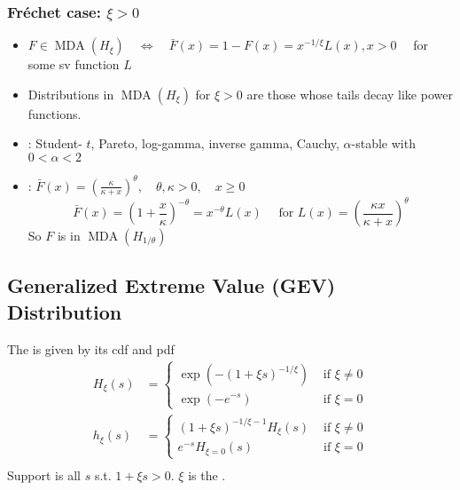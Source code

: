 \subsubsection*{Fréchet case: $\xi>0$}
\begin{itemize}[leftmargin=*]
    \item $F \in \operatorname{MDA}\left(H_{\xi}\right) \quad \Leftrightarrow \quad \bar{F}(x)=1-F(x)=x^{-1 / \xi} L(x), x>0 \quad$ for some sv function $L$

    \item Distributions in $\operatorname{MDA}\left(H_{\xi}\right)$ for $\xi>0$ are those whose tails decay like power functions.

    \item {}: Student- $t$, Pareto, log-gamma, inverse gamma, Cauchy, $\alpha$-stable with $0<\alpha<2$

    \item {}:  $\bar{F}(x)=\left(\frac{\kappa}{\kappa+x}\right)^{\theta}, \quad \theta, \kappa>0, \quad x \geq 0$
$$
\bar{F}(x)=\left(1+\frac{x}{\kappa}\right)^{-\theta}=x^{-\theta} L(x) \quad \text { for } L(x)=\left(\frac{\kappa x}{\kappa+x}\right)^{\theta}
$$
So $F$ is in $\operatorname{MDA}\left(H_{1 / \theta}\right)$
\end{itemize}







\subsection*{Generalized Extreme Value (GEV) Distribution}
The  is given by its cdf and pdf
$$
\begin{aligned}
H_{\xi}(s)&= \begin{cases}\exp \left(-(1+\xi s)^{-1 / \xi}\right) & \text { if } \xi \neq 0 \\ \exp \left(-e^{-s}\right) & \text { if } \xi=0\end{cases} \\ 
h_{\xi}(s)&= \begin{cases}(1+\xi s)^{-1 / \xi-1} H_{\xi}(s) & \text { if } \xi \neq 0 \\ e^{-s} H_{\xi=0}(s) & \text { if } \xi=0\end{cases} \\
\end{aligned}
$$
Support is all $s$ s.t. $1+\xi s>0$. $\xi$ is the .


